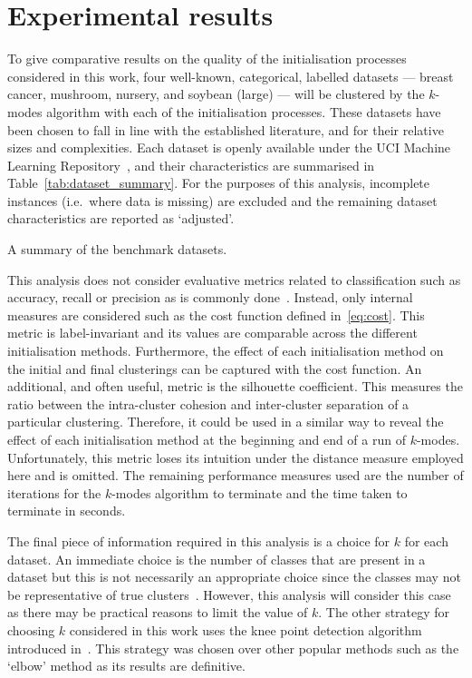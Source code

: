 \section{Experimental results}\label{sec:results}

To give comparative results on the quality of the initialisation processes
considered in this work, four well-known, categorical, labelled datasets ---
breast cancer, mushroom, nursery, and soybean (large) --- will be clustered by
the \(k\)-modes algorithm with each of the initialisation processes. These
datasets have been chosen to fall in line with the established literature, and
for their relative sizes and complexities. Each dataset is openly available
under the UCI Machine Learning Repository~\cite{Dua2019}, and their
characteristics are summarised in Table~\ref{tab:dataset_summary}. For the
purposes of this analysis, incomplete instances (i.e.\ where data is missing)
are excluded and the remaining dataset characteristics are reported as
`adjusted'.

\begin{table}[htbp]
    \resizebox{\textwidth}{!}{%
        
    }\caption{A summary of the benchmark datasets.}\label{tab:dataset_summary}
\end{table}

This analysis does not consider evaluative metrics related to classification
such as accuracy, recall or precision as is commonly done~\cite{%
    Arthur2007,Cao2009,Cao2012,Huang1998,%
    Ng2007,Olaode2014,Schaeffer2007,Sharma2015%
}. Instead, only internal measures are considered such as the cost function
defined in~\eqref{eq:cost}. This metric is label-invariant and its values are
comparable across the different initialisation methods. Furthermore, the effect
of each initialisation method on the initial and final clusterings can be
captured with the cost function. An additional, and often useful, metric is the
silhouette coefficient. This measures the ratio between the intra-cluster
cohesion and inter-cluster separation of a particular clustering. Therefore, it
could be used in a similar way to reveal the effect of each initialisation
method at the beginning and end of a run of \(k\)-modes. Unfortunately, this
metric loses its intuition under the distance measure employed here and is
omitted. The remaining performance measures used are the number of iterations
for the \(k\)-modes algorithm to terminate and the time taken to terminate in
seconds.

The final piece of information required in this analysis is a choice for \(k\)
for each dataset. An immediate choice is the number of classes that are present
in a dataset but this is not necessarily an appropriate choice since the classes
may not be representative of true clusters~\cite{Memoli2011}. However, this
analysis will consider this case as there may be practical reasons to limit the
value of \(k\). The other strategy for choosing \(k\) considered in this work
uses the knee point detection algorithm introduced in~\cite{Satopaa2011}. This
strategy was chosen over other popular methods such as the `elbow' method as its
results are definitive.

